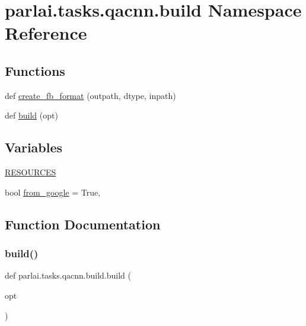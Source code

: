\hypertarget{namespaceparlai_1_1tasks_1_1qacnn_1_1build}{}\section{parlai.\+tasks.\+qacnn.\+build Namespace Reference}
\label{namespaceparlai_1_1tasks_1_1qacnn_1_1build}
\subsection*{Functions}
\begin{DoxyCompactItemize}
\item 
def \hyperlink{namespaceparlai_1_1tasks_1_1qacnn_1_1build_add8d5f440ef973d77d8f63cc11197dce}{create\+\_\+fb\+\_\+format} (outpath, dtype, inpath)
\item 
def \hyperlink{namespaceparlai_1_1tasks_1_1qacnn_1_1build_a75d46e5e4248f77e7a6b83c7038144fa}{build} (opt)
\end{DoxyCompactItemize}
\subsection*{Variables}
\begin{DoxyCompactItemize}
\item 
\hyperlink{namespaceparlai_1_1tasks_1_1qacnn_1_1build_a5573dcfd7b1ecf634c159df1ae25e94f}{R\+E\+S\+O\+U\+R\+C\+ES}
\item 
bool \hyperlink{namespaceparlai_1_1tasks_1_1qacnn_1_1build_a64eee1d9bbe5faac5b152bae72cb8d92}{from\+\_\+google} = True,
\end{DoxyCompactItemize}


\subsection{Function Documentation}
\mbox{\label{namespaceparlai_1_1tasks_1_1qacnn_1_1build_a75d46e5e4248f77e7a6b83c7038144fa}} 
\subsubsection{\texorpdfstring{build()}{build()}}
{\footnotesize\ttfamily def parlai.\+tasks.\+qacnn.\+build.\+build (\begin{DoxyParamCaption}\item[{}]{opt }\end{DoxyParamCaption})}



